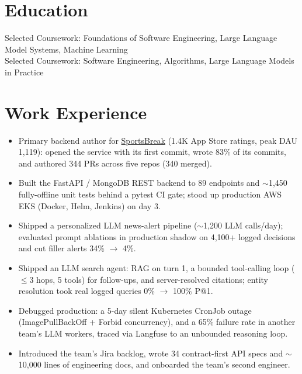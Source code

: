 \documentclass[11pt, letterpaper]{article}
\begin{document}

\section{Education}
Selected Coursework: Foundations of Software Engineering, Large Language Model Systems, Machine Learning\\[1pt]
Selected Coursework: Software Engineering, Algorithms, Large Language Models in Practice

\section{Work Experience}
\begin{itemize}
  \item Primary backend author for \href{https://apps.apple.com/app/id6762649287}{SportsBreak} (1.4K App Store ratings, peak DAU 1{,}119): opened the service with its first commit, wrote 83\% of its commits, and authored 344 PRs across five repos (340 merged).
  \item Built the FastAPI / MongoDB REST backend to 89 endpoints and $\sim$1{,}450 fully-offline unit tests behind a pytest CI gate; stood up production AWS EKS (Docker, Helm, Jenkins) on day 3.
  \item Shipped a personalized LLM news-alert pipeline ($\sim$1{,}200 LLM calls/day); evaluated prompt ablations in production shadow on 4{,}100+ logged decisions and cut filler alerts 34\% $\to$ 4\%.
  \item Shipped an LLM search agent: RAG on turn 1, a bounded tool-calling loop ($\le$3 hops, 5 tools) for follow-ups, and server-resolved citations; entity resolution took real logged queries 0\% $\to$ 100\% P@1.
  \item Debugged production: a 5-day silent Kubernetes CronJob outage (ImagePullBackOff + Forbid concurrency), and a 65\% failure rate in another team's LLM workers, traced via Langfuse to an unbounded reasoning loop.
  \item Introduced the team's Jira backlog, wrote 34 contract-first API specs and $\sim$10{,}000 lines of engineering docs, and onboarded the team's second engineer.
\end{itemize}
\end{document}
